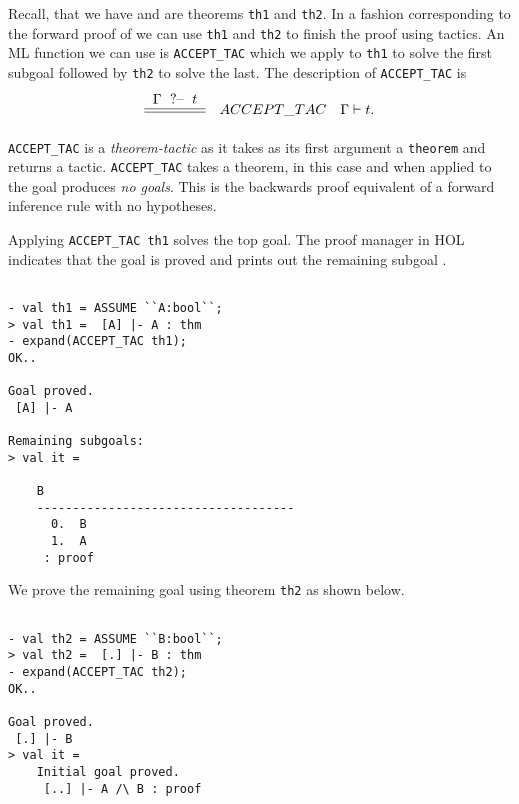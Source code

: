 Recall, that we have  and  are theorems
\texttt{th1} and \texttt{th2}.  In a fashion corresponding to the
forward proof of  we can use \texttt{th1} and
\texttt{th2} to finish the proof using tactics.  An ML function we can
use is \verb|ACCEPT_TAC| which we apply to \texttt{th1} to solve the
first subgoal followed by \texttt{th2} to solve the last. The
description of \verb|ACCEPT_TAC| is
\begin{gather*}
  \tac
  {\goals{\Gamma}{t}}
  {}
  {ACCEPT\_TAC \quad \seqs{\Gamma}{t}}.
\end{gather*}
\verb|ACCEPT_TAC| is a \emph{theorem-tactic} as it takes as its first
argument a \texttt{theorem} and returns a tactic. \verb|ACCEPT_TAC|
takes a theorem, in this case  and when applied to the goal
 produces \emph{no goals}. This is the backwards proof
equivalent of a forward inference rule with no hypotheses.

Applying \verb|ACCEPT_TAC th1| solves the top goal. The proof manager
in HOL indicates that the goal is proved and prints out the remaining
subgoal .
\begin{session}
  \label{session:top-goal-solved}
  \begin{scriptsize}
\begin{verbatim}

- val th1 = ASSUME ``A:bool``;
> val th1 =  [A] |- A : thm
- expand(ACCEPT_TAC th1);
OK..

Goal proved.
 [A] |- A

Remaining subgoals:
> val it =
    
    B
    ------------------------------------
      0.  B
      1.  A
     : proof
\end{verbatim}
  \end{scriptsize}
\end{session}

We prove the remaining goal using theorem \texttt{th2} as shown below.
\begin{session}
  \begin{scriptsize}
\begin{verbatim}

- val th2 = ASSUME ``B:bool``;
> val th2 =  [.] |- B : thm
- expand(ACCEPT_TAC th2);
OK..

Goal proved.
 [.] |- B
> val it =
    Initial goal proved.
     [..] |- A /\ B : proof
\end{verbatim}
  \end{scriptsize}
\end{session}

